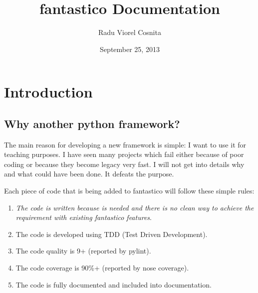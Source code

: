 \documentclass[letterpaper,10pt,english]{sphinxmanual}
\title{fantastico Documentation}
\date{September 25, 2013}
\author{Radu Viorel Cosnita}
\begin{document}
\maketitle
\tableofcontents
{}\label{index::doc}



\chapter{Introduction}
\label{intro:introduction}\label{intro::doc}\label{intro:fantastico-framework}

\section{Why another python framework?}
\label{intro:why-another-python-framework}
The main reason for developing a new framework is simple: I want to use it for teaching purposes. I have seen many projects which
fail either because of poor coding or because they become legacy very fast. I will not get into details why and what could have
been done. It defeats the purpose.

Each piece of code that is being added to fantastico will follow these simple rules:
\begin{enumerate}
\item {} 
\emph{The code is written because is needed and there is no clean way to achieve the requirement with existing fantastico features}.

\item {} 
The code is developed using TDD (Test Driven Development).

\item {} 
The code quality is 9+ (reported by pylint).

\item {} 
The code coverage is 90\%+ (reported by nose coverage).

\item {} 
The code is fully documented and included into documentation.

\end{enumerate}
\end{document}
